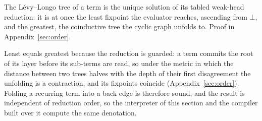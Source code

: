 \begin{theorem}\label{thm:unique}
  The L\'evy--Longo tree of a term is the unique solution of its tabled weak-head reduction: it is at once the least fixpoint the evaluator reaches, ascending from $\bot$, and the greatest, the coinductive tree the cyclic graph unfolds to. Proof in Appendix~\ref{sec:order}.
\end{theorem}

\noindent Least equals greatest because the reduction is guarded: a term commits the root of its layer before its sub-terms are read, so under the metric in which the distance between two trees halves with the depth of their first disagreement the unfolding is a contraction, and its fixpoints coincide (Appendix~\ref{sec:order}). Folding a recurring term into a back edge is therefore sound, and the result is independent of reduction order, so the interpreter of this section and the compiler built over it compute the same denotation.

